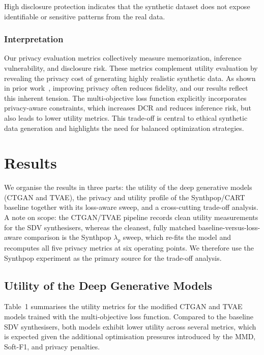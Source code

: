 \documentclass[11pt]{article}
\begin{document}
High disclosure protection indicates that the synthetic dataset does not expose identifiable or sensitive patterns from the real data.

\subsubsection{Interpretation}

Our privacy evaluation metrics collectively measure memorization, inference vulnerability, and disclosure risk. These metrics complement utility evaluation by revealing the privacy cost of generating highly realistic synthetic data. As shown in prior work~\cite{stadler2022synthetic}, improving privacy often reduces fidelity, and our results reflect this inherent tension. The multi-objective loss function explicitly incorporates privacy-aware constraints, which increases DCR and reduces inference risk, but also leads to lower utility metrics. This trade-off is central to ethical synthetic data generation and highlights the need for balanced optimization strategies.


\section{Results}

We organise the results in three parts: the utility of the deep generative models (CTGAN and TVAE), the privacy and utility profile of the Synthpop/CART baseline together with its loss-aware sweep, and a cross-cutting trade-off analysis. A note on scope: the CTGAN/TVAE pipeline records clean utility measurements for the SDV synthesisers, whereas the cleanest, fully matched baseline-versus-loss-aware comparison is the Synthpop $\lambda_p$ sweep, which re-fits the model and recomputes all five privacy metrics at six operating points. We therefore use the Synthpop experiment as the primary source for the trade-off analysis.

\subsection{Utility of the Deep Generative Models}

Table~1 summarises the utility metrics for the modified CTGAN and TVAE models trained with the multi-objective loss function. Compared to the baseline SDV synthesisers, both models exhibit lower utility across several metrics, which is expected given the additional optimisation pressures introduced by the MMD, Soft-F1, and privacy penalties.
\end{document}
